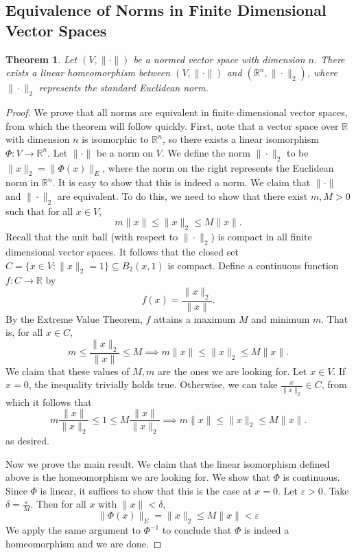 \documentclass{article}
\theoremstyle{plain} %
\newtheorem{thm}{Theorem}
\numberwithin{thm}{section} %
\theoremstyle{definition}
\begin{document}
    \subsection{Equivalence of Norms in Finite Dimensional Vector Spaces}
    \begin{thm}
        Let \((V, \|\cdot\|)\) be a normed vector space with dimension \(n\). There exists a linear homeomorphism between \((V, \|\cdot \|)\) and \((\mathbb{R}^n, \|\cdot\| _2)\), where \(\|\cdot\| _2\) represents the standard Euclidean norm.
    \end{thm}
    \begin{proof}
        We prove that all norms are equivalent in finite dimensional vector spaces, from which the theorem will follow quickly. First, note that a vector space over \(\mathbb{R}\) with dimension \(n\) is isomorphic to \(\mathbb{R}^n\), so there exists a linear isomorphism \(\Phi : V \to \mathbb{R}^n\). Let \(\|\cdot\|\) be a norm on \(V\). We define the norm \(\|\cdot\| _2\) to be \(\|x\| _2 = \|\Phi (x)\| _E\), where the norm on the right represents the Euclidean norm in \(\mathbb{R}^n\). It is easy to show that this is indeed a norm. We claim that \(\|\cdot \|\) and \(\|\cdot \| _2\) are equivalent. To do this, we need to show that there exist \(m,M > 0\) such that for all \(x \in V\),
        \[
            m\|x\| \leq \|x\| _2 \leq M \|x\|.
        \]
        Recall that the unit ball (with respect to \(\|\cdot\| _2\)) is compact in all finite dimensional vector spaces. It follows that the closed set \(C = \{ x \in V : \|x\| _2 = 1 \} \subseteq B_2(x,1)\) is compact. Define a continuous function \(f: C \to \mathbb{R}\) by
        \[
            f(x) = \frac{\|x\| _2}{\|x\|}.
        \]
        By the Extreme Value Theorem, \(f\) attains a maximum \(M\) and minimum \(m\). That is, for all \(x \in C\),
        \[
            m \leq \frac{\|x\| _2}{\|x\|} \leq M \implies m \|x\| \leq \|x\| _2 \leq M \|x\|.
        \]
        We claim that these values of \(M,m\) are the ones we are looking for. Let \(x \in V\). If \(x = 0\), the inequality trivially holds true. Otherwise, we can take \(\frac{x}{\|x\| _2} \in C\), from which it follows that
        \[
            m \frac{\|x\|}{\|x\| _2} \leq 1 \leq M \frac{\|x\|}{\|x\| _2} \implies m \|x\| \leq \|x\| _2 \leq M \|x\|.
        \]
        as desired.

        Now we prove the main result. We claim that the linear isomorphism defined above is the homeomorphism we are looking for. We show that \(\Phi\) is continuous. Since \(\Phi\) is linear, it suffices to show that this is the case at \(x = 0\). Let \(\varepsilon > 0\). Take \(\delta = \frac{\varepsilon}{M}\). Then for all \(x\) with \(\|x\| < \delta\),
        \[
            \|\Phi (x)\| _E = \|x\| _2 \leq M \|x\| < \varepsilon
        \]
        We apply the same argument to \(\Phi ^{-1}\) to conclude that \(\Phi\) is indeed a homeomorphism and we are done.
    \end{proof}
\end{document}
